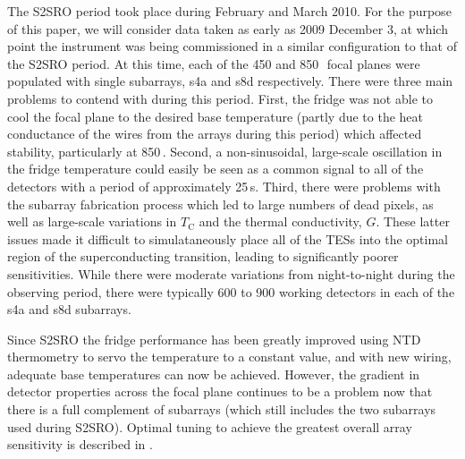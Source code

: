 \documentclass[useAMS,usenatbib,nofootinbib]{mn2e}
\begin{document}
The S2SRO period took place during February and March 2010. For the
purpose of this paper, we will consider data taken as early as 2009
December 3, at which point the instrument was being commissioned in a
similar configuration to that of the S2SRO period. At this time, each
of the 450 and 850\,\micron\ focal planes were populated with single
subarrays, s4a and s8d respectively. There were three main problems to
contend with during this period. First, the fridge was not able to
cool the focal plane to the desired base temperature (partly due to
the heat conductance of the wires from the arrays during this period)
which affected stability, particularly at 850\,\micron. Second, a
non-sinusoidal, large-scale oscillation in the fridge temperature
could easily be seen as a common signal to all of the detectors with a
period of approximately 25\,s.  Third, there were problems with the
subarray fabrication process which led to large numbers of dead
pixels, as well as large-scale variations in $T_\mathrm{C}$ and the
thermal conductivity, $G$. These latter issues made it difficult to
simulataneously place all of the TESs into the optimal region of the
superconducting transition, leading to significantly poorer
sensitivities. While there were moderate variations from
night-to-night during the observing period, there were typically 600
to 900 working detectors in each of the s4a and s8d subarrays.

Since S2SRO the fridge performance has been greatly improved using NTD
thermometry to servo the temperature to a constant value, and with new
wiring, adequate base temperatures can now be achieved. However, the
gradient in detector properties across the focal plane continues to be
a problem now that there is a full complement of subarrays (which
still includes the two subarrays used during S2SRO). Optimal tuning to
achieve the greatest overall array sensitivity is described in
\citet{holland2012}.
\end{document}
